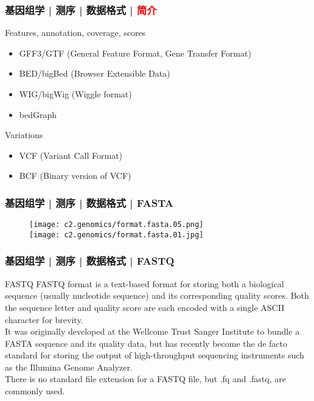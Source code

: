 \begin{frame}
  \frametitle{基因组学 | 测序 | 数据格式 | \textcolor{red}{简介}}
  \begin{block}{Features, annotation, coverage, scores}
    \begin{itemize}
      \item GFF3/GTF (General Feature Format, Gene Transfer Format)
      \item BED/bigBed (Browser Extensible Data)
      \item WIG/bigWig (Wiggle format)
      \item bedGraph
    \end{itemize}
  \end{block}
  \pause
  \begin{block}{Variations}
    \begin{itemize}
      \item VCF (Variant Call Format)
      \item BCF (Binary version of VCF)
    \end{itemize}
  \end{block}
\end{frame}
    
\begin{frame}
  \frametitle{基因组学 | 测序 | 数据格式 | FASTA}
  \begin{figure}
    \centering
    \texttt{[image: c2.genomics/format.fasta.05.png]}\\
    \vspace{1em}
    \texttt{[image: c2.genomics/format.fasta.01.jpg]}
  \end{figure}
\end{frame}
    
\begin{frame}
  \frametitle{基因组学 | 测序 | 数据格式 | FASTQ}
  \begin{block}{FASTQ}
FASTQ format is a text-based format for storing both a biological sequence (usually nucleotide sequence) and its corresponding quality scores. Both the sequence letter and quality score are each encoded with a single ASCII character for brevity.\\
\vspace{1em}
It was originally developed at the Wellcome Trust Sanger Institute to bundle a FASTA sequence and its quality data, but has recently become the de facto standard for storing the output of high-throughput sequencing instruments such as the Illumina Genome Analyzer.\\
\vspace{1em}
There is no standard file extension for a FASTQ file, but .fq and .fastq, are commonly used.
  \end{block}
\end{frame}
    
